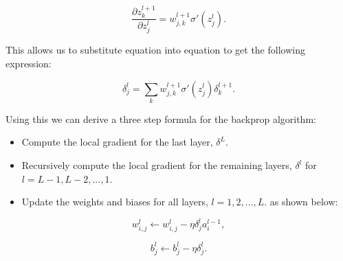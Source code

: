 \begin{equation}
    \label{eq:dzl1dz}
    \frac{\partial z_k^{l+1}}{\partial z_j^l} = w_{j,k}^{l+1}\sigma'(z_j^l).
\end{equation}

This allows us to substitute equation into equation  to get the following expression:


\begin{equation}
    \label{eq:localgradient2}
    \delta_j^l = \sum_k w_{j,k}^{l+1}\sigma'(z_j^l)\delta_k^{l+1}.
\end{equation}

Using this we can derive a three step formula for the backprop algorithm:
\begin{itemize}
    \item Compute the local gradient for the last layer, $\delta^L$.
    \item Recursively compute the local gradient for the remaining layers, $\delta^l$ for $l=L-1, L-2, ..., 1$.
    \item Update the weights and biases for all layers, $l=1, 2, ..., L$. as shown below: 
\end{itemize}

\begin{equation*}
    w_{i,j}^{l} \leftarrow w_{i,j}^{l} - \eta \delta_j^l a_i^{l-1},
\end{equation*}


\begin{equation*}
    b_j^l \leftarrow b_j^l - \eta \delta_j^l.
\end{equation*}
